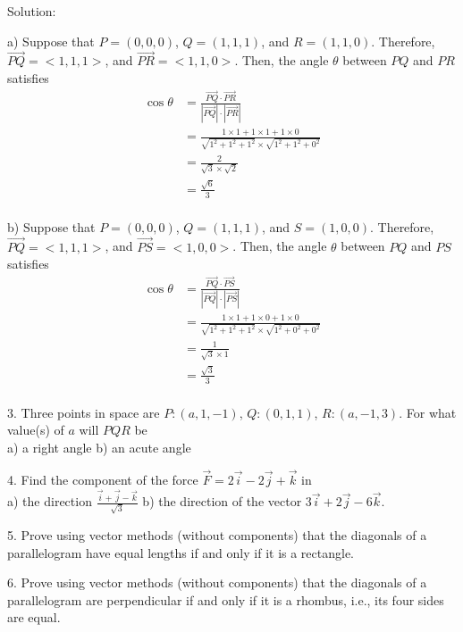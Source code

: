 \documentclass{article}
\begin{document}
Solution:

a) Suppose that $P = (0, 0, 0)$, $Q = (1, 1, 1)$, and $R = (1, 1, 0)$. 
Therefore, $\vec{PQ} = <1, 1, 1>$, and $\vec{PR} = <1, 1, 0>$. Then, the angle
$\theta$ between $PQ$ and $PR$ satisfies
\[
  \begin{split}
    \cos\theta &= \frac{\vec{PQ} \cdot \vec{PR}}{|\vec{PQ}| \cdot |\vec{PR}|} \\
               &= \frac{1 \times 1 + 1 \times 1 + 1 \times 0}{\sqrt{1^2 + 1^2 + 1^2} \times \sqrt{1^2 + 1^2 + 0^2}} \\
               &= \frac{2}{\sqrt{3} \times \sqrt{2}} \\
               &= \frac{\sqrt{6}}{3} \\
  \end{split}
\]

b) Suppose that $P = (0, 0, 0)$, $Q = (1, 1, 1)$, and $S = (1, 0, 0)$. 
Therefore, $\vec{PQ} = <1, 1, 1>$, and $\vec{PS} = <1, 0, 0>$. Then, the angle
$\theta$ between $PQ$ and $PS$ satisfies
\[
  \begin{split}
    \cos\theta &= \frac{\vec{PQ} \cdot \vec{PS}}{|\vec{PQ}| \cdot |\vec{PS}|} \\
               &= \frac{1 \times 1 + 1 \times 0 + 1 \times 0}{\sqrt{1^2 + 1^2 + 1^2} \times \sqrt{1^2 + 0^2 + 0^2}} \\
               &= \frac{1}{\sqrt{3} \times 1} \\
               &= \frac{\sqrt{3}}{3} \\
  \end{split}
\]

3. Three points in space are $P:(a,1,-1)$, $Q:(0,1,1)$, $R:(a,-1,3)$. For what
value(s) of $a$ will $PQR$ be\\
a) a right angle \hspace{10px} b) an acute angle

4. Find the component of the force $\vec{F} = 2 \vec{i} - 2 \vec{j} + \vec{k}$
in\\
a) the direction $\frac{\vec{i} + \vec{j} - \vec{k}}{\sqrt{3}}$ \hspace{10px}
b) the direction of the vector $3 \vec{i} + 2 \vec{j} - 6 \vec{k}$.

5. Prove using vector methods (without components) that the diagonals of a
parallelogram have equal lengths if and only if it is a rectangle.

6. Prove using vector methods (without components) that the diagonals of a
parallelogram are perpendicular if and only if it is a rhombus, i.e., its four
sides are equal.
\end{document}

